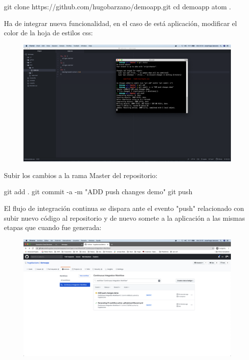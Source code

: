 \documentclass[a4paper,11pt]{book}
\begin{document}
git clone https://github.com/hugobarzano/demoapp.git
cd demoapp
atom . 
 
 Ha de integrar nueva funcionalidad, en el caso de está aplicación, modificar el color de la hoja de estilos css:
 
 \begin{figure}[H]
\centering
\includegraphics[scale=0.2]{imagenes/casouso/2_5.png}
\caption{   }
\end{figure}

 Subir los cambios a la rama Master del repositorio:
 
 git add .
git commit -a -m "ADD push changes demo"
 git push
 
 
 El flujo de integración continua se dispara ante el evento "push" relacionado con subir nuevo código al repositorio y de nuevo somete a la aplicación a las mismas etapas que cuando fue generada:
 
  \begin{figure}[H]
\centering
\includegraphics[scale=0.2]{imagenes/casouso/2_6.png}
\caption{   }
\end{figure}
\end{document}
